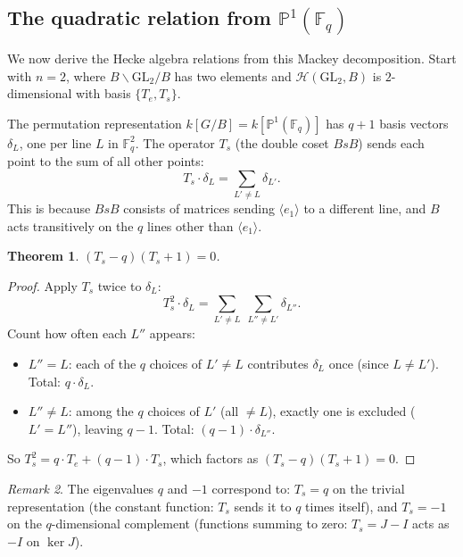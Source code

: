 \documentclass[12pt,a4paper]{article}
\newtheorem{theorem}{Theorem}[section]
\theoremstyle{definition}
\theoremstyle{remark}
\newtheorem{remark}[theorem]{Remark}
\newcommand{\F}{\mathbb{F}}
\newcommand{\GL}{\mathrm{GL}}
\newcommand{\Hecke}{\mathcal{H}}
\begin{document}
\subsection{The quadratic relation from $\mathbb{P}^1(\F_q)$}

We now derive the Hecke algebra relations from this Mackey
decomposition. Start with $n = 2$, where $B \backslash \GL_2 / B$
has two elements and $\Hecke(\GL_2, B)$ is $2$-dimensional with
basis $\{T_e, T_s\}$.

The permutation representation $k[G/B] = k[\mathbb{P}^1(\F_q)]$
has $q + 1$ basis vectors $\delta_L$, one per line $L$ in $\F_q^2$.
The operator $T_s$ (the double coset $BsB$) sends each point to the
sum of all other points:
\begin{equation}\label{eq:Ts-action}
  T_s \cdot \delta_L = \sum_{L' \neq L} \delta_{L'}.
\end{equation}
This is because $BsB$ consists of matrices sending
$\langle e_1 \rangle$ to a different line, and $B$ acts transitively
on the $q$ lines other than $\langle e_1 \rangle$.

\begin{theorem}\label{thm:quadratic}
$(T_s - q)(T_s + 1) = 0$.
\end{theorem}

\begin{proof}
Apply $T_s$ twice to $\delta_L$:
\[
  T_s^2 \cdot \delta_L
  = \sum_{L' \neq L}\; \sum_{L'' \neq L'} \delta_{L''}.
\]
Count how often each $L''$ appears:
\begin{itemize}
\item $L'' = L$: each of the $q$ choices of $L' \neq L$ contributes
  $\delta_L$ once (since $L \neq L'$). Total: $q \cdot \delta_L$.
\item $L'' \neq L$: among the $q$ choices of $L'$ (all $\neq L$),
  exactly one is excluded ($L' = L''$), leaving $q - 1$.
  Total: $(q-1) \cdot \delta_{L''}$.
\end{itemize}
So $T_s^2 = q \cdot T_e + (q-1) \cdot T_s$, which factors as
$(T_s - q)(T_s + 1) = 0$.
\end{proof}

\begin{remark}
The eigenvalues $q$ and $-1$ correspond to:
$T_s = q$ on the trivial representation (the constant function:
$T_s$ sends it to $q$ times itself), and $T_s = -1$ on the
$q$-dimensional complement (functions summing to zero:
$T_s = J - I$ acts as $-I$ on $\ker J$).
\end{remark}
\end{document}
